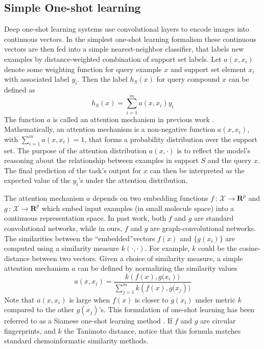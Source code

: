 \documentclass[journal=jacsat,manuscript=article]{achemso}
\begin{document}
\subsection{Simple One-shot learning}

Deep one-shot learning systems \cite{santoro2016one, vinyals2016matching} use convolutional layers to encode images into continuous vectors. In the simplest one-shot learning formalism these continuous vectors are then fed into a simple nearest-neighbor classifier, that labels new examples by distance-weighted combination of support set labels. Let $a(x, x_i)$ denote some weighting function for query example $x$ and support set element $x_i$ with associated label $y_i$. Then the label $h_S(x)$ for query compound $x$ can be defined as
\[
h_S(x) = \sum\limits_{i=1}^{m}a\left(x,x_i\right)y_i
\]
The function $a$ is called an attention mechanism in previous work \cite{vinyals2016matching}. Mathematically, an attention mechanism is a non-negative function $a(x,x_i)$, with $\sum\nolimits_{i=1}^{m}a(x,x_i)=1$, that forms a probability distribution over the support set. The purpose of the attention distribution $a(x, \cdot)$ is to reflect the model's reasoning about the relationship between examples in support $S$ and the query $x$. The final prediction of the task's output for $x$ can then be interpreted as the expected value of the $y_i$'s under the attention distribution.

The attention mechanism $a$ depends on two embedding functions $f\,:\,\mathcal{X}\rightarrow\mathbf{R}^p$ and $g\,:\,\mathcal{X}\rightarrow\mathbf{R}^p$ which embed input examples (in small molecule space) into a continuous representation space. In past work, both $f$ and $g$ are standard convolutional networks, while in ours, $f$ and $g$ are graph-convolutional networks. The similarities between the ``embedded''vectors $f(x)$ and $\{g(x_i)\}$ are computed using a similarity measure $k(\cdot,\cdot)$.  For example, $k$ could be the cosine-distance between two vectors. Given a choice of similarity measure, a simple attention mechanism $a$ can be defined by normalizing the similarity values
\[
a(x,x_i) = \frac{k\left(f(x),g(x_i\right))}{\sum\nolimits_{j=1}^{m} k\left(f(x),g(x_j\right))}
\]
Note that $a(x,x_i)$ is large when $f(x)$ is closer to $g(x_i)$ under metric $k$ compared to the other $g(x_j)$'s. This formulation of one-shot learning has been referred to as a Siamese one-shot learning method \cite{koch2015siamese}. If $f$ and $g$ are circular fingerprints\cite{rogers2010extended}, and $k$ the Tanimoto distance, notice that this formula matches standard chemoinformatic similarity methods.
\end{document}
